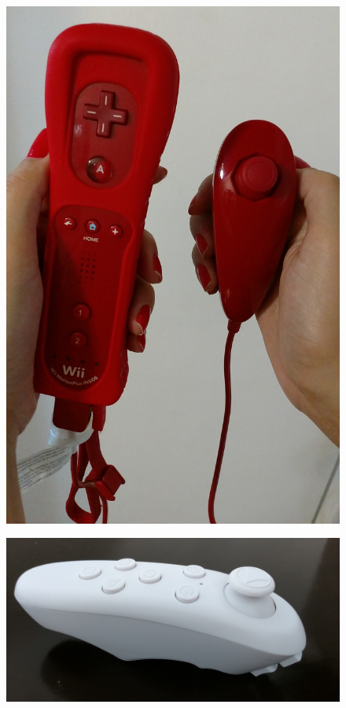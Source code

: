 \begin{figure}[H]
	
	\begin{minipage}{.5\textwidth}{
			\centering
			\includegraphics[width=.7\linewidth]{Imagens/wiiremote.jpg}		
			\label{f.wiiremote}	
		}
	\end{minipage}
	\begin{minipage}{.5\textwidth}{
			\centering
			\includegraphics[width=.7\linewidth]{Imagens/controlevrbox.jpg}		
			\label{f.controlevrbox}
		}
	\end{minipage}
	
\end{figure}

